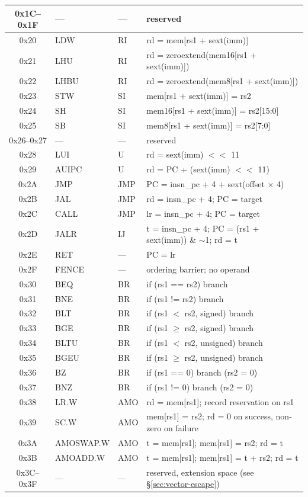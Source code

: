 \documentclass[11pt,a4paper]{article}
\begin{document}
\begin{table}[htbp]
\begin{tabular}{cllp{7.4cm}}
0x1C--0x1F & --- & --- & reserved \\
\midrule
0x20 & LDW    & RI  & rd = mem[rs1 + sext(imm)] \\
0x21 & LHU    & RI  & rd = zeroextend(mem16[rs1 + sext(imm)]) \\
0x22 & LHBU   & RI  & rd = zeroextend(mem8[rs1 + sext(imm)]) \\
0x23 & STW    & SI  & mem[rs1 + sext(imm)] = rs2 \\
0x24 & SH     & SI  & mem16[rs1 + sext(imm)] = rs2[15:0] \\
0x25 & SB     & SI  & mem8[rs1 + sext(imm)] = rs2[7:0] \\
0x26--0x27 & --- & --- & reserved \\
\midrule
0x28 & LUI    & U   & rd = sext(imm) $<<$ 11 \\
0x29 & AUIPC  & U   & rd = PC + (sext(imm) $<<$ 11) \\
\midrule
0x2A & JMP    & JMP & PC = insn\_pc + 4 + sext(offset $\times$ 4) \\
0x2B & JAL    & JMP & rd = insn\_pc + 4; PC = target \\
0x2C & CALL   & JMP & lr = insn\_pc + 4; PC = target \\
0x2D & JALR   & IJ  & t = insn\_pc + 4; PC = (rs1 + sext(imm)) \& $\sim$1; rd = t \\
0x2E & RET    & --- & PC = lr \\
0x2F & FENCE  & --- & ordering barrier; no operand \\
\midrule
0x30 & BEQ    & BR  & if (rs1 == rs2) branch \\
0x31 & BNE    & BR  & if (rs1 != rs2) branch \\
0x32 & BLT    & BR  & if (rs1 $<$ rs2, signed) branch \\
0x33 & BGE    & BR  & if (rs1 $\geq$ rs2, signed) branch \\
0x34 & BLTU   & BR  & if (rs1 $<$ rs2, unsigned) branch \\
0x35 & BGEU   & BR  & if (rs1 $\geq$ rs2, unsigned) branch \\
0x36 & BZ     & BR  & if (rs1 == 0) branch \quad (rs2 = 0) \\
0x37 & BNZ    & BR  & if (rs1 != 0) branch \quad (rs2 = 0) \\
\midrule
0x38 & LR.W    & AMO & rd = mem[rs1]; record reservation on rs1 \\
0x39 & SC.W    & AMO & mem[rs1] = rs2; rd = 0 on success, non-zero on failure \\
0x3A & AMOSWAP.W & AMO & t = mem[rs1]; mem[rs1] = rs2; rd = t \\
0x3B & AMOADD.W  & AMO & t = mem[rs1]; mem[rs1] = t + rs2; rd = t \\
\midrule
0x3C--0x3F & --- & --- & reserved, extension space (see \S\ref{sec:vector-escape}) \\
\bottomrule
\end{tabular}
\end{table}
\end{document}

